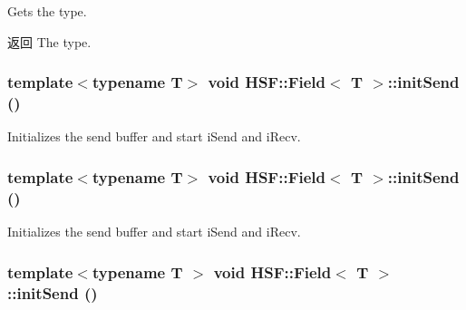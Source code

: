Gets the type. \begin{DoxyReturn}{返回}
The type. 
\end{DoxyReturn}
\hypertarget{classHSF_1_1Field_aeffce8b232389b100bb2408347c68943}{
\subsubsection[{initSend}]{\setlength{\rightskip}{0pt plus 5cm}template$<$typename T$>$ void {\bf HSF::Field}$<$ T $>$::initSend ()}}
\label{classHSF_1_1Field_aeffce8b232389b100bb2408347c68943}


Initializes the send buffer and start iSend and iRecv. \hypertarget{classHSF_1_1Field_aeffce8b232389b100bb2408347c68943}{
\subsubsection[{initSend}]{\setlength{\rightskip}{0pt plus 5cm}template$<$typename T$>$ void {\bf HSF::Field}$<$ T $>$::initSend ()}}
\label{classHSF_1_1Field_aeffce8b232389b100bb2408347c68943}


Initializes the send buffer and start iSend and iRecv. \hypertarget{classHSF_1_1Field_aeffce8b232389b100bb2408347c68943}{
\subsubsection[{initSend}]{\setlength{\rightskip}{0pt plus 5cm}template$<$typename T $>$ void {\bf HSF::Field}$<$ T $>$::initSend ()}}
\label{classHSF_1_1Field_aeffce8b232389b100bb2408347c68943}


